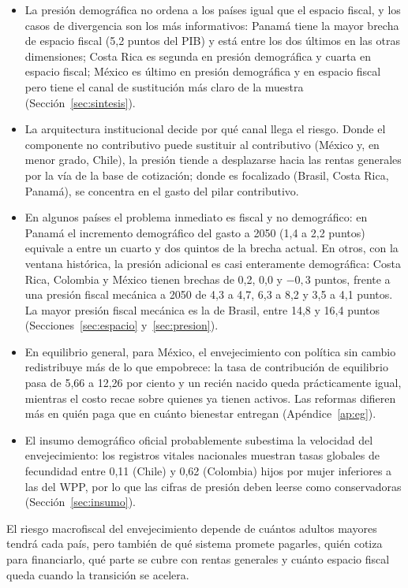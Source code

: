 \documentclass[12pt, letterpaper]{article}
\begin{document}
\begin{itemize}
  \item La presión demográfica no ordena a los países igual que el espacio fiscal,
  y los casos de divergencia son los más informativos: Panamá tiene la mayor brecha
  de espacio fiscal (5,2 puntos del PIB) y está entre los dos últimos en las otras
  dimensiones; Costa Rica es segunda en presión demográfica y cuarta en espacio
  fiscal; México es último en presión demográfica y en espacio fiscal pero tiene el canal de
  sustitución más claro de la muestra (Sección~\ref{sec:sintesis}).
  \item La arquitectura institucional decide por qué canal llega el riesgo. Donde
  el componente no contributivo puede sustituir al contributivo (México y, en menor
  grado, Chile), la presión tiende a desplazarse hacia las rentas generales por la
  vía de la base de cotización; donde es focalizado (Brasil, Costa Rica, Panamá), se
  concentra en el gasto del pilar contributivo.
  \item En algunos países el problema inmediato es fiscal y no demográfico: en
  Panamá el incremento demográfico del gasto a 2050 (1,4 a 2,2 puntos) equivale a
  entre un cuarto y dos quintos de la brecha actual. En otros, con la ventana
  histórica, la presión adicional es casi enteramente demográfica: Costa Rica,
  Colombia y México tienen brechas de 0,2, 0,0 y $-0{,}3$ puntos, frente a una
  presión fiscal mecánica a 2050 de 4,3 a 4,7, 6,3 a 8,2 y 3,5 a 4,1 puntos. La mayor presión fiscal mecánica es la de Brasil, entre 14,8 y 16,4
  puntos (Secciones~\ref{sec:espacio} y~\ref{sec:presion}).
  \item En equilibrio general, para México, el envejecimiento con política sin
  cambio redistribuye más de lo que empobrece: la tasa de contribución de
  equilibrio pasa de 5,66 a 12,26 por ciento y un recién nacido queda prácticamente
  igual, mientras el costo recae sobre quienes ya tienen activos. Las reformas
  difieren más en quién paga que en cuánto bienestar entregan
  (Apéndice~\ref{ap:eg}).
  \item El insumo demográfico oficial probablemente subestima la velocidad del
  envejecimiento: los registros vitales nacionales muestran tasas globales de
  fecundidad entre 0,11 (Chile) y 0,62 (Colombia) hijos por mujer inferiores a las
  del WPP, por lo que las cifras de presión deben leerse como conservadoras
  (Sección~\ref{sec:insumo}).
\end{itemize}

El riesgo macrofiscal del envejecimiento depende de cuántos adultos mayores tendrá
cada país, pero también de qué sistema promete pagarles, quién cotiza para
financiarlo, qué parte se cubre con rentas generales y cuánto espacio fiscal queda
cuando la transición se acelera.
\end{document}

